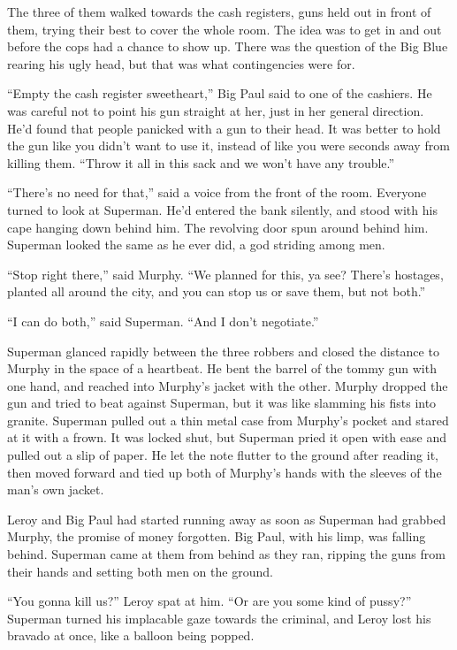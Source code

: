 The three of them walked towards the cash registers, guns held out in
front of them, trying their best to cover the whole room. The idea was
to get in and out before the cops had a chance to show up. There was the
question of the Big Blue rearing his ugly head, but that was what
contingencies were for.

``Empty the cash register sweetheart,'' Big Paul said to one of the
cashiers. He was careful not to point his gun straight at her, just in
her general direction. He'd found that people panicked with a gun to
their head. It was better to hold the gun like you didn't want to use
it, instead of like you were seconds away from killing them. ``Throw it
all in this sack and we won't have any trouble.''

``There's no need for that,'' said a voice from the front of the room.
Everyone turned to look at Superman. He'd entered the bank silently, and
stood with his cape hanging down behind him. The revolving door spun
around behind him. Superman looked the same as he ever did, a god
striding among men.

``Stop right there,'' said Murphy. ``We planned for this, ya see?
There's hostages, planted all around the city, and you can stop us or
save them, but not both.''

``I can do both,'' said Superman. ``And I don't negotiate.''

Superman glanced rapidly between the three robbers and closed the
distance to Murphy in the space of a heartbeat. He bent the barrel of
the tommy gun with one hand, and reached into Murphy's jacket with the
other. Murphy dropped the gun and tried to beat against Superman, but it
was like slamming his fists into granite. Superman pulled out a thin
metal case from Murphy's pocket and stared at it with a frown. It was
locked shut, but Superman pried it open with ease and pulled out a slip
of paper. He let the note flutter to the ground after reading it, then
moved forward and tied up both of Murphy's hands with the sleeves of the
man's own jacket.

Leroy and Big Paul had started running away as soon as Superman had
grabbed Murphy, the promise of money forgotten. Big Paul, with his limp,
was falling behind. Superman came at them from behind as they ran,
ripping the guns from their hands and setting both men on the ground.

``You gonna kill us?'' Leroy spat at him. ``Or are you some kind of
pussy?'' Superman turned his implacable gaze towards the criminal, and
Leroy lost his bravado at once, like a balloon being popped.

